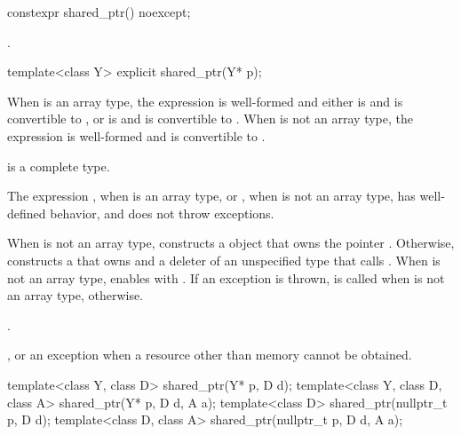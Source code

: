 %
\begin{itemdecl}
constexpr shared_ptr() noexcept;
\end{itemdecl}

\begin{itemdescr}
\pnum
\ensures
{}.
\end{itemdescr}

%
\begin{itemdecl}
template<class Y> explicit shared_ptr(Y* p);
\end{itemdecl}

\begin{itemdescr}
\pnum
\constraints
When  is an array type,
the expression  is well-formed and either
 is  and  is convertible to , or
 is  and  is convertible to .
When  is not an array type,
the expression  is well-formed and
 is convertible to .

\pnum
\mandates
{} is a complete type.

\pnum
\expects
The expression
, when  is an array type, or
, when  is not an array type,
has well-defined behavior, and
does not throw exceptions.

\pnum
\effects
When  is not an array type,
constructs a  object
that owns the pointer .
Otherwise, constructs a 
that owns  and a deleter of an
unspecified type that calls .
When  is not an array type,
enables  with .
If an exception is thrown,  is called
when  is not an array type,  otherwise.

\pnum
\ensures
{}.

\pnum
\throws
{}, or an  exception when a resource other than memory cannot be obtained.
\end{itemdescr}

%
\begin{itemdecl}
template<class Y, class D> shared_ptr(Y* p, D d);
template<class Y, class D, class A> shared_ptr(Y* p, D d, A a);
template<class D> shared_ptr(nullptr_t p, D d);
template<class D, class A> shared_ptr(nullptr_t p, D d, A a);
\end{itemdecl}

